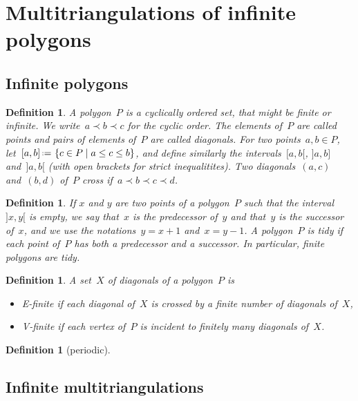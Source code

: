 \documentclass{amsart}
\newtheorem{definition}[theorem]{Definition}
\theoremstyle{remark}
\newcommand{\darkblue}{\color{darkblue}} %
\newcommand{\defn}[1]{\textsl{\darkblue #1}} %
\newcommand{\set}[2]{\left\{ #1 \;\middle|\; #2 \right\}} %
\newcommand{\eqdef}{\mbox{\,\raisebox{0.2ex}{\scriptsize\ensuremath{\mathrm:}}\ensuremath{=}\,}} %
\newcommand*{\ef}[0]{E-finite\xspace}
\newcommand*{\vf}[0]{V-finite\xspace}
\newcommand{\cl}{\prec}
\begin{document}
\section{Multitriangulations of infinite polygons}
\label{sec:infiniteMultitriangulations}


\subsection{Infinite polygons}

\begin{definition}
A \defn{polygon}~$P$ is a cyclically ordered set, that might be finite or infinite.
We write~$a \cl b \cl c$ for the cyclic order.
The elements of~$P$ are called \defn{points} and pairs of elements of~$P$ are called \defn{diagonals}.
For two points~$a,b \in P$, let~$[a,b] \eqdef \set{c \in P}{a \le c \le b}$, and define similarly the intervals~$[a,b[$, $]a,b]$ and~$]a,b[$ (with open brackets for strict inequalitites).
Two diagonals~$(a,c)$ and~$(b,d)$ of~$P$ \defn{cross} if~$a \cl b \cl c \cl d$.
\end{definition}

\begin{definition}
If $x$ and $y$ are two points of a polygon~$P$ such that the interval~$]x,y[$ is empty, we say that~$x$ is the \defn{predecessor} of~$y$ and that~$y$ is the \defn{successor} of~$x$, and we use the notations~$y = x+1$ and~$x = y-1$. A polygon~$P$ is \defn{tidy} if each point of~$P$ has both a predecessor and a successor. In particular, finite polygons are tidy.
\end{definition}

\begin{definition}
A set~$X$ of diagonals of a polygon~$P$ is 
\begin{itemize}
\item \defn{\ef} if each diagonal of~$X$ is crossed by a finite number of diagonals of~$X$,
\item \defn{\vf} if each vertex of~$P$ is incident to finitely many diagonals of~$X$.
\end{itemize}
\end{definition}

\begin{definition}[periodic]

\end{definition}


\subsection{Infinite multitriangulations}
\end{document}
